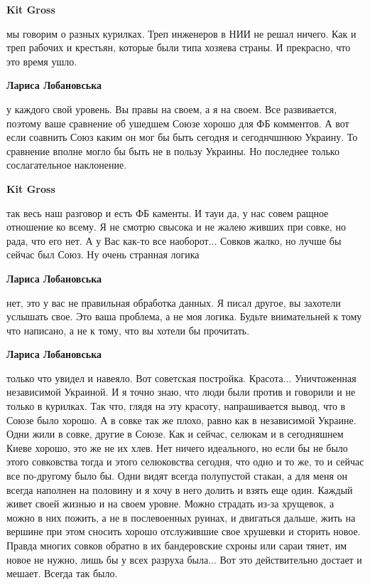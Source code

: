 \begin{itemize}
\begin{itemize}
\begin{itemize}
\textbf{Kit Gross} 

мы говорим о разных курилках. Треп инженеров в НИИ не решал ничего. Как и треп
рабочих и крестьян, которые были типа хозяева страны. И прекрасно, что это
время ушло.

\textbf{Лариса Лобановська} 

у каждого свой уровень. Вы правы на своем, а я на своем. Все развивается,
поэтому ваше сравнение об ушедшем Союзе хорошо для ФБ комментов. А вот если
соавнить Союз каким он мог бы быть сегодня и сегоднчшнюю Украину. То сравнение
вполне могло бы быть не в пользу Украины. Но последнее только сослагательное
наклонение.

\textbf{Kit Gross} 

так весь наш разговор и есть ФБ каменты. И тауи да, у нас совем ращное
отношение ко всему. Я не смотрю свысока и не жалею живших при совке, но рада,
что его нет. А у Вас как-то все наоборот... Совков жалко, но лучше бы сейчас
был Союз. Ну очень странная логика

\textbf{Лариса Лобановська} 

нет, это у вас не правильная обработка данных. Я писал другое, вы захотели
услышать свое. Это ваша проблема, а не моя логика. Будьте внимательней к тому
что написано, а не к тому, что вы хотели бы прочитать.

\textbf{Лариса Лобановська} 

только что увидел и навеяло. Вот советская постройка. Красота... Уничтоженная
независимой Украиной. И я точно знаю, что люди были против и говорили и не
только в курилках. Так что, глядя на эту красоту, напрашивается вывод, что в
Союзе было хорошо. А в совке так же плохо, равно как в независимой Украине.
Одни жили в совке, другие в Союзе. Как и сейчас, селюкам и в сегодняшнем Киеве
хорошо, это же не их хлев. Нет ничего идеального, но если бы не было этого
совковства тогда и этого селюковства сегодня, что одно и то же, то и сейчас все
по-другому было бы. Одни видят всегда полупустой стакан, а для меня он всегда
наполнен на половину и я хочу в него долить и взять еще один. Каждый живет
своей жизнью и на своем уровне. Можно страдать из-за хрущевок, а можно в них
пожить, а не в послевоенных руинах, и двигаться дальше, жить на вершине при
этом сносить хорошо отслужившие свое хрушевки и сторить новое. Правда многих
совков обратно в их бандеровские схроны или сараи тянет, им новое не нужно,
лишь бы у всех разруха была... Вот это действительно достает и мешает. Всегда
так было.


\end{itemize}
\end{itemize}
\end{itemize}
